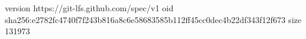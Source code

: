 version https://git-lfs.github.com/spec/v1
oid sha256:e2782fc4740f7f243b816a8c6e58683585b112ff45cc0dec4b22df343f12f673
size 131973
